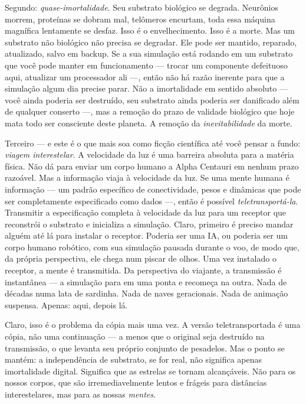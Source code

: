 \documentclass[11pt, twoside, openright]{book}
\begin{document}
Segundo: \textit{quase-imortalidade}. Seu substrato biológico se degrada. Neurônios morrem, proteínas se dobram mal, telômeros encurtam, toda essa máquina magnífica lentamente se desfaz. Isso é o envelhecimento. Isso é a morte. Mas um substrato não biológico não precisa se degradar. Ele pode ser mantido, reparado, atualizado, salvo em backup. Se a sua simulação está rodando em um substrato que você pode manter em funcionamento --- trocar um componente defeituoso aqui, atualizar um processador ali ---, então não há razão inerente para que a simulação algum dia precise parar. Não a imortalidade em sentido absoluto --- você ainda poderia ser destruído, seu substrato ainda poderia ser danificado além de qualquer conserto ---, mas a remoção do prazo de validade biológico que hoje mata todo ser consciente deste planeta. A remoção da \textit{inevitabilidade} da morte.

Terceiro --- e este é o que mais soa como ficção científica até você pensar a fundo: \textit{viagem interestelar}. A velocidade da luz é uma barreira absoluta para a matéria física. Não dá para enviar um corpo humano a Alpha Centauri em nenhum prazo razoável. Mas a informação viaja à velocidade da luz. Se uma mente humana é informação --- um padrão específico de conectividade, pesos e dinâmicas que pode ser completamente especificado como dados ---, então é possível \textit{teletransportá-la}. Transmitir a especificação completa à velocidade da luz para um receptor que reconstrói o substrato e inicializa a simulação. Claro, primeiro é preciso mandar alguém até lá para instalar o receptor. Poderia ser uma IA, ou poderia ser um corpo humano robótico, com sua simulação pausada durante o voo, de modo que, da própria perspectiva, ele chega num piscar de olhos. Uma vez instalado o receptor, a mente é transmitida. Da perspectiva do viajante, a transmissão é instantânea --- a simulação para em uma ponta e recomeça na outra. Nada de décadas numa lata de sardinha. Nada de naves geracionais. Nada de animação suspensa. Apenas: aqui, depois lá.

Claro, isso é o problema da cópia mais uma vez. A versão teletransportada é uma cópia, não uma continuação --- a menos que o original seja destruído na transmissão, o que levanta seu próprio conjunto de pesadelos. Mas o ponto se mantém: a independência de substrato, se for real, não significa apenas imortalidade digital. Significa que as estrelas se tornam alcançáveis. Não para os nossos corpos, que são irremediavelmente lentos e frágeis para distâncias interestelares, mas para as nossas \textit{mentes}.
\end{document}
